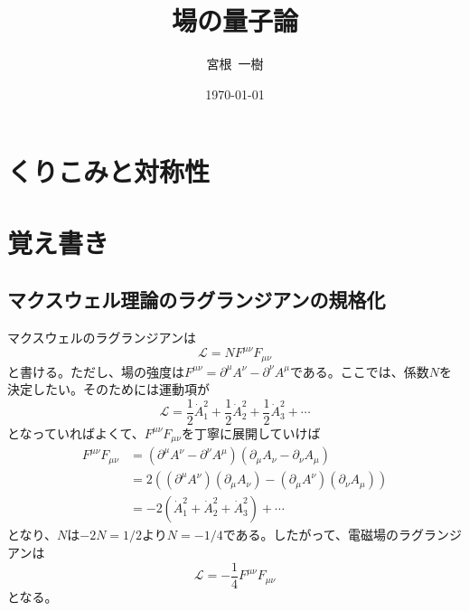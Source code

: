 \documentclass[unicode,a4paper,11pt]{ltjsarticle}
\title{
  場の量子論
}
\author{
  宮根\ 一樹
}
\date{\today}
\renewcommand{\theequation}{\thesection.\arabic{equation}}
\renewcommand{\thefigure}{\thesection.\arabic{figure}}
\renewcommand{\thetable}{\thesection.\arabic{table}}
\begin{document}
\maketitle
\tableofcontents

\clearpage
\section{くりこみと対称性}



















\clearpage

\makeatletter
\renewcommand{\appendix}{\par
  \setcounter{section}{0}%
  \setcounter{subsection}{0}%
  \gdef\presectionname{\appendixname}%
  \gdef\postsectionname{}%
  \gdef\thesection{\presectionname\@Alph\c@section\postsectionname}%
  \gdef\thesubsection{\@Alph\c@section.\@arabic\c@subsection}%
  \renewcommand{\theequation}{\@Alph\c@section.\arabic{equation}}%
  \renewcommand{\thefigure}{\@Alph\c@section.\arabic{figure}}%
  \renewcommand{\thetable}{\@Alph\c@section.\arabic{table}}%
}
\makeatother
\appendix

\section{覚え書き}

\subsection{マクスウェル理論のラグランジアンの規格化}

マクスウェルのラグランジアンは
\begin{equation}
  \mathcal{L}
  =
  NF^{\mu\nu}F_{\mu\nu}
\end{equation}
と書ける。ただし、場の強度は$F^{\mu\nu}=\partial^{\mu}A^{\nu}-\partial^{\nu}A^{\mu}$である。ここでは、係数$N$を決定したい。そのためには運動項が
\begin{equation}
  \mathcal{L}
  =
  \frac{1}{2}\dot{A}_{1}^2
  +
  \frac{1}{2}\dot{A}_{2}^2
  +
  \frac{1}{2}\dot{A}_{3}^2
  +
  \cdots
\end{equation}
となっていればよくて、$F^{\mu\nu}F_{\mu\nu}$を丁寧に展開していけば
\begin{align}
  F^{\mu\nu}F_{\mu\nu}
   & =
  (\partial^{\mu}A^{\nu}-\partial^{\nu}A^{\mu})
  (\partial_{\mu}A_{\nu}-\partial_{\nu}A_{\mu})
  \nonumber
  \\
   & =
  2((\partial^{\mu}A^{\nu})(\partial_{\mu}A_{\nu})-(\partial_{\mu}A^{\nu})(\partial_{\nu}A_{\mu}))
  \nonumber
  \\
   & =
  -2(\dot{A}_{1}^2+\dot{A}_{2}^2+\dot{A}_{3}^2)+\cdots
\end{align}
となり、$N$は$-2N=1/2$より$N=-1/4$である。したがって、電磁場のラグランジアンは
\begin{equation}
  \mathcal{L}
  =
  -\frac{1}{4}F^{\mu\nu}F_{\mu\nu}
\end{equation}
となる。
\end{document}
